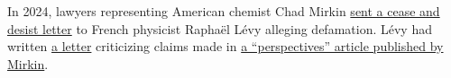 \documentclass[letterpaper, 12pt]{article}
\begin{document}
In 2024, lawyers representing American chemist Chad Mirkin \href{https://retractionwatch.com/2024/07/16/kavli-prize-winner-threatens-to-sue-critic-for-defamation/}{sent a cease and desist letter} to French physicist Rapha\"{e}l L\'{e}vy alleging defamation. L\'{e}vy had written \href{https://doi.org/10.5281/zenodo.12746733}{a letter} criticizing claims made in \href{https://doi.org/10.1073/pnas.2306973121}{a ``perspectives'' article published by Mirkin}.
\end{document}
